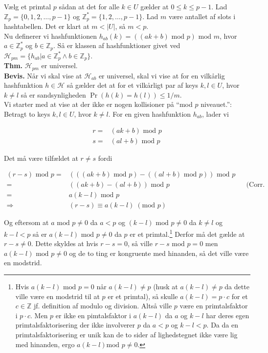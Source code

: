 \documentclass[12pt]{article}
\newcommand{\Z}{\mathbb{Z}}
\begin{document}
Vælg et primtal $p$ sådan at det for alle $k \in U$ gælder at $0 \le k \le p-1$. Lad $\Z_p=\{0,1,2,\ldots, p-1\}$ og $\Z_p^* = \{1,2,\ldots,p-1\}$. Lad $m$ være antallet af slots i hashtabellen. Det er klart at $m<|U|$, så $m<p$. \\

Nu definerer vi hashfunktionen $h_{ab}(k)=((ak+b) \text{ mod } p) \text{ mod } m$, hvor $a \in \Z_p^*$ og $b \in \Z_p$. Så er klassen af hashfunktioner givet ved $\mathcal{H}_{pm}=\{h_{ab}| a \in \Z_p^* \wedge b \in \Z_p\}$. \\

\textbf{Thm.} $\mathcal{H}_{pm}$ er universel. \\

\textbf{Bevis.} Når vi skal vise at $\mathcal{H}_{ab}$ er universel, skal vi vise at for en vilkårlig hashfunktion $h \in \mathcal{H}$ så gælder det at for et vilkårligt par af keys $k,l \in U$, hvor $k \ne l$ så er sandsynligheden $\Pr(h(k)=h(l)) \le 1/m$. \\

Vi starter med at vise at der ikke er nogen kollisioner på ``mod $p$ niveauet.'':\\

Betragt to keys $k,l \in U$, hvor $k \ne l$. For en given hashfunktion $h_{ab}$, lader vi

\begin{align*}
    r =& (ak+b) \text{ mod } p \\
    s =& (al+b) \text{ mod } p
\end{align*}

Det må være tilfældet at $r \ne s$ fordi

\begin{align*}
    (r-s) \text{ mod } p =& (((ak+b) \text{ mod } p)-((al+b) \text{ mod } p)) \text{ mod } p \\
    =& ((ak+b)-(al+b)) \text{ mod } p && \text{(Corr. 4.1.2 i Rosen)} \\
    =& a(k-l) \text{ mod } p \\
    \Rightarrow & (r-s) \equiv a(k-l) \; (\text{mod }p)
\end{align*}

Og eftersom at $a \text{ mod } p \ne 0$ da $a < p$ og $(k-l) \text{ mod } p \ne 0$ da $k \ne l$ og $k-l < p$ så er $a(k-l) \text{ mod }p \ne 0$ da $p$ er et primtal.\footnote{Hvis $a(k-l) \text{ mod } p=0$ når $a(k-l) \ne p$ (husk at $a(k-l) \ne p$ da dette ville være en modstrid til at $p$ er et primtal), så skulle $a(k-l) = p \cdot c$ for et $c \in \Z$ jf. definition af modulo og division. Altså ville $p$ være en primtalsfaktor i $p \cdot c$. Men $p$ er ikke en pimtalsfaktor i $a(k-l)$ da $a$ og $k-l$ har deres egen primtalsfaktorisering der ikke involverer $p$ da $a < p$ og $k-l<p$. Da da en primtalsfaktorisering er unik kan de to sider af lighedstegnet ikke være lig med hinanden, ergo $a(k-l) \text {mod } p \ne 0$.} Derfor må det gælde at $r-s \ne 0$. Dette skyldes at hvis $r-s=0$, så ville $r-s \text{ mod }p = 0$ men $a(k-l) \text{ mod } p \ne 0$ og de to ting er kongruente med hinanden, så det ville være en modstrid. \\
\end{document}
